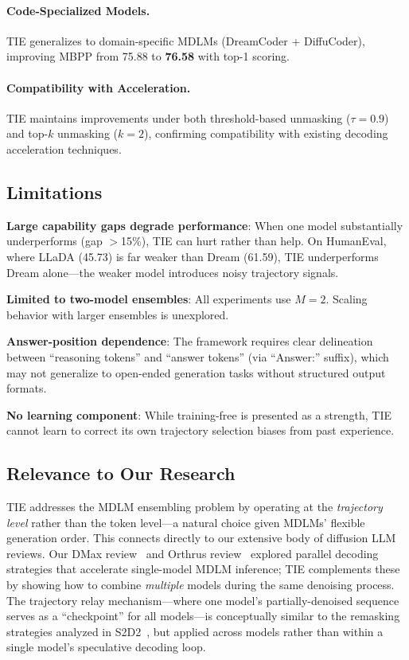 \documentclass[11pt,a4paper]{article}
\begin{document}
\paragraph{Code-Specialized Models.} TIE generalizes to domain-specific MDLMs (DreamCoder + DiffuCoder), improving MBPP from 75.88 to \textbf{76.58} with top-1 scoring.

\paragraph{Compatibility with Acceleration.} TIE maintains improvements under both threshold-based unmasking ($\tau=0.9$) and top-$k$ unmasking ($k=2$), confirming compatibility with existing decoding acceleration techniques.

\subsection{Limitations}

\textbf{Large capability gaps degrade performance}: When one model substantially underperforms (gap $>$15\%), TIE can hurt rather than help. On HumanEval, where LLaDA (45.73) is far weaker than Dream (61.59), TIE underperforms Dream alone---the weaker model introduces noisy trajectory signals.

\textbf{Limited to two-model ensembles}: All experiments use $M=2$. Scaling behavior with larger ensembles is unexplored.

\textbf{Answer-position dependence}: The framework requires clear delineation between ``reasoning tokens'' and ``answer tokens'' (via ``Answer:'' suffix), which may not generalize to open-ended generation tasks without structured output formats.

\textbf{No learning component}: While training-free is presented as a strength, TIE cannot learn to correct its own trajectory selection biases from past experience.

\subsection{Relevance to Our Research}

TIE addresses the MDLM ensembling problem by operating at the \emph{trajectory level} rather than the token level---a natural choice given MDLMs' flexible generation order. This connects directly to our extensive body of diffusion LLM reviews. Our DMax review~\cite{huang2026dmax} and Orthrus review~\cite{wang2026orthrus} explored parallel decoding strategies that accelerate single-model MDLM inference; TIE complements these by showing how to combine \emph{multiple} models during the same denoising process. The trajectory relay mechanism---where one model's partially-denoised sequence serves as a ``checkpoint'' for all models---is conceptually similar to the remasking strategies analyzed in S2D2~\cite{chen2026s2d2}, but applied across models rather than within a single model's speculative decoding loop.
\end{document}
